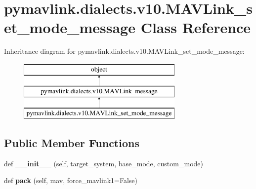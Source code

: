 \hypertarget{classpymavlink_1_1dialects_1_1v10_1_1MAVLink__set__mode__message}{}\section{pymavlink.\+dialects.\+v10.\+M\+A\+V\+Link\+\_\+set\+\_\+mode\+\_\+message Class Reference}
\label{classpymavlink_1_1dialects_1_1v10_1_1MAVLink__set__mode__message}
Inheritance diagram for pymavlink.\+dialects.\+v10.\+M\+A\+V\+Link\+\_\+set\+\_\+mode\+\_\+message\+:\begin{figure}[H]
\begin{center}
\leavevmode
\includegraphics[height=3.000000cm]{classpymavlink_1_1dialects_1_1v10_1_1MAVLink__set__mode__message}
\end{center}
\end{figure}
\subsection*{Public Member Functions}
\begin{DoxyCompactItemize}
\item 
\mbox{\label{classpymavlink_1_1dialects_1_1v10_1_1MAVLink__set__mode__message_ace51fc50500b1404fae2fa7b3fcfef45}} 
def {\bfseries \+\_\+\+\_\+init\+\_\+\+\_\+} (self, target\+\_\+system, base\+\_\+mode, custom\+\_\+mode)
\item 
\mbox{\label{classpymavlink_1_1dialects_1_1v10_1_1MAVLink__set__mode__message_aa62175680eeddb7ab2326c414b452b80}} 
def {\bfseries pack} (self, mav, force\+\_\+mavlink1=False)
\end{DoxyCompactItemize}
